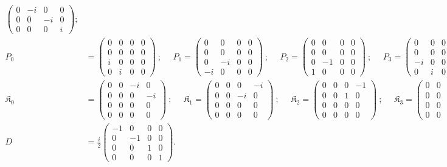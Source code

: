 \documentclass[]{article}
\numberwithin{equation}{section}
\begin{document}
{{\begin{align*}
\begin{pmatrix}
    0&-i&0&0\\
    0&0&-i&0\\
    0&0&0&i
    \end{pmatrix};\\
    P_0&=\begin{pmatrix}
    0&0&0&0\\
    0&0&0&0\\
    i&0&0&0\\
    0&i&0&0
    \end{pmatrix}~;~~~~~~P_1=\begin{pmatrix}
    0&0&0&0\\
    0&0&0&0\\
    0&-i&0&0\\
    -i&0&0&0
    \end{pmatrix}~;~~~~~~P_2=\begin{pmatrix}
    0&0&0&0\\
    0&0&0&0\\
    0&-1&0&0\\
    1&0&0&0
    \end{pmatrix}~;~~~~~~P_3=\begin{pmatrix}
    0&0&0&0\\
    0&0&0&0\\
    -i&0&0&0\\
    0&i&0&0
    \end{pmatrix}\\
    \mathfrak{K}_0&=\begin{pmatrix}
    0&0&-i&0\\
    0&0&0&-i\\
    0&0&0&0\\
    0&0&0&0
    \end{pmatrix}~;~~~~~~\mathfrak{K}_1=\begin{pmatrix}
    0&0&0&-i\\
    0&0&-i&0\\
    0&0&0&0\\
    0&0&0&0
    \end{pmatrix}~;~~~~~~\mathfrak{K}_2=\begin{pmatrix}
    0&0&0&-1\\
    0&0&1&0\\
    0&0&0&0\\
    0&0&0&0
    \end{pmatrix}~;~~~~~~\mathfrak{K}_3=\begin{pmatrix}
    0&0&-i&0\\
    0&0&0&i\\
    0&0&0&0\\
    0&0&0&0
    \end{pmatrix}\\
    D&=\frac{i}{2}\begin{pmatrix}
    -1&0&0&0\\
    0&-1&0&0\\
    0&0&1&0\\
    0&0&0&1
    \end{pmatrix}.
\end{align*}


}}
\end{document}
